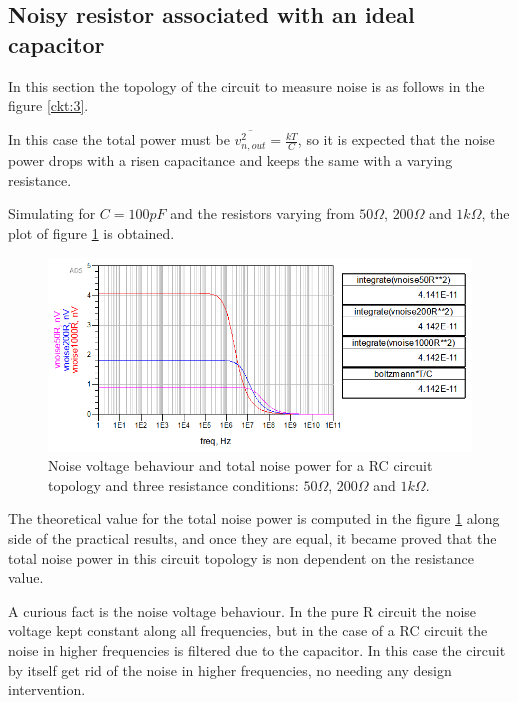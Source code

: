 \subsection{Noisy resistor associated with an ideal capacitor}

In this section the topology of the circuit to measure noise is as follows in the figure \ref{ckt:3}.



In this case the total power must be $\overline{v_{n,out}^2} = \frac{kT}{C}$, so it is expected that the noise power drops with a risen capacitance and keeps the same with a varying resistance. 

Simulating for $C=100pF$ and the resistors varying from $50 \Omega$, $200 \Omega$ and $1 k\Omega$, the plot of figure \ref{fig:ac3} is obtained.

\begin{figure}[H] 
\centering
\includegraphics[width=12cm]{images/rcnoise.png}
\caption{Noise voltage behaviour and total noise power for a RC circuit topology and three resistance conditions: $50 \Omega$, $200 \Omega$ and $1 k\Omega$.}
\label{fig:ac3} 
\end{figure}

The theoretical value for the total noise power is computed in the figure \ref{fig:ac3} along side of the practical results, and once they are equal, it became proved that the total noise power in this circuit topology is non dependent on the resistance value.

A curious fact is the noise voltage behaviour. In the pure R circuit the noise voltage kept constant along all frequencies, but in the case of a RC circuit the noise in higher frequencies is filtered due to the capacitor. In this case the circuit by itself get rid of the noise in higher frequencies, no needing any design intervention.
